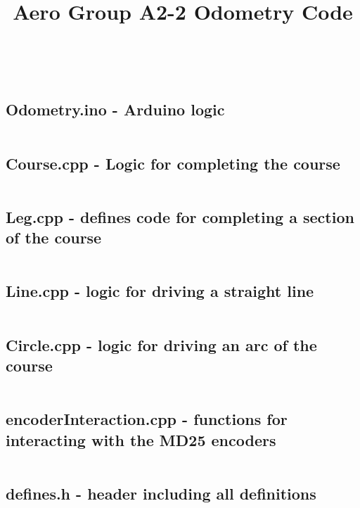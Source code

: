 \documentclass{article}
\title{Aero Group A2-2 Odometry Code}
\makeatletter
\let\Title\@title
\makeatother
\begin{document}
    \begin{center}
        \Large \textbf{\Title} \\[0.8cm]
        \normalsize
    \end{center}

    \subsection*{Odometry.ino - Arduino logic}

    \inputminted[linenos]{cpp}{./Odometry/Odometry.ino}

    \subsection*{Course.cpp - Logic for completing the course}

    \inputminted[linenos]{cpp}{./Odometry/Course.cpp}

    \subsection*{Leg.cpp - defines code for completing a section of the course}

    \inputminted[linenos]{cpp}{./Odometry/Leg.cpp}

    \subsection*{Line.cpp - logic for driving a straight line}

    \inputminted[linenos]{cpp}{./Odometry/Line.cpp}

    \subsection*{Circle.cpp - logic for driving an arc of the course}

    \inputminted[linenos]{cpp}{./Odometry/Circle.cpp}

    \subsection*{encoderInteraction.cpp - functions for interacting with the MD25 encoders}

    \inputminted[linenos]{cpp}{./Odometry/encoderInteraction.cpp}

    \subsection*{defines.h - header including all definitions}

    \inputminted[linenos]{cpp}{./Odometry/defines.h}
    
\end{document}
